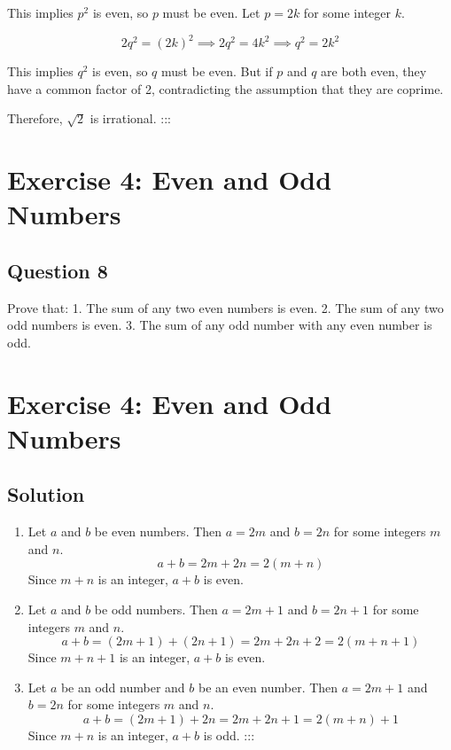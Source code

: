 \documentclass[
  11pt,
  letterpaper,
  DIV=11,
  numbers=noendperiod]{scrartcl}
\begin{document}
This implies \(p^2\) is even, so \(p\) must be even. Let \(p = 2k\) for
some integer \(k\).

\[
2q^2 = (2k)^2 \implies 2q^2 = 4k^2 \implies q^2 = 2k^2
\]

This implies \(q^2\) is even, so \(q\) must be even. But if \(p\) and
\(q\) are both even, they have a common factor of 2, contradicting the
assumption that they are coprime.

Therefore, \(\sqrt{2}\) is irrational. :::

\section{Exercise 4: Even and Odd
Numbers}\label{exercise-4-even-and-odd-numbers}

\subsection{Question 8}\label{question-8}

Prove that: 1. The sum of any two even numbers is even. 2. The sum of
any two odd numbers is even. 3. The sum of any odd number with any even
number is odd.

\section{Exercise 4: Even and Odd
Numbers}\label{exercise-4-even-and-odd-numbers-1}

\subsection{Solution}\label{solution-3}

\begin{enumerate}
\def\labelenumi{\arabic{enumi}.}
\item
  Let \(a\) and \(b\) be even numbers. Then \(a = 2m\) and \(b = 2n\)
  for some integers \(m\) and \(n\). \[
  a + b = 2m + 2n = 2(m + n)
  \] Since \(m + n\) is an integer, \(a + b\) is even.
\item
  Let \(a\) and \(b\) be odd numbers. Then \(a = 2m + 1\) and
  \(b = 2n + 1\) for some integers \(m\) and \(n\). \[
  a + b = (2m + 1) + (2n + 1) = 2m + 2n + 2 = 2(m + n + 1)
  \] Since \(m + n + 1\) is an integer, \(a + b\) is even.
\item
  Let \(a\) be an odd number and \(b\) be an even number. Then
  \(a = 2m + 1\) and \(b = 2n\) for some integers \(m\) and \(n\). \[
  a + b = (2m + 1) + 2n = 2m + 2n + 1 = 2(m + n) + 1
  \] Since \(m + n\) is an integer, \(a + b\) is odd. :::
\end{enumerate}
\end{document}

